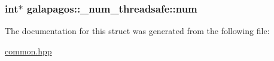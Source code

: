 \subsubsection[{\texorpdfstring{num}{num}}]{\setlength{\rightskip}{0pt plus 5cm}int$\ast$ galapagos\+::\+\_\+num\+\_\+threadsafe\+::num}\hypertarget{structgalapagos_1_1__num__threadsafe_aa1de95bb520c7fa28c2edca48dc11f94}{}\label{structgalapagos_1_1__num__threadsafe_aa1de95bb520c7fa28c2edca48dc11f94}


The documentation for this struct was generated from the following file\+:\begin{DoxyCompactItemize}
\item 
\hyperlink{common_8hpp}{common.\+hpp}\end{DoxyCompactItemize}
